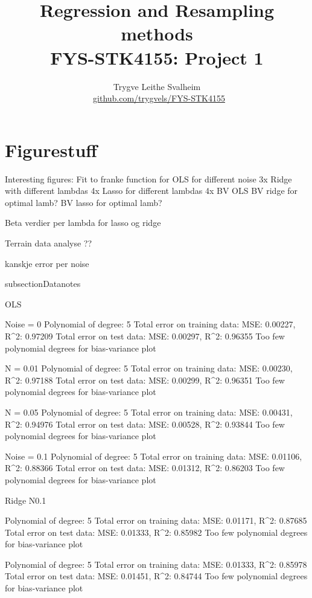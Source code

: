 \documentclass[a4paper, twocolumn]{article}
\title{{\sc Regression and Resampling methods \\ {\large FYS-STK4155: Project 1}}}
\author{Trygve Leithe Svalheim \\ \faGithub \ {\small \href{https://github.com/trygvels/FYS-STK4155}{github.com/trygvels/FYS-STK4155}}}
\begin{document}
\twocolumn[
\begin{@twocolumnfalse}
\maketitle
\begin{abstract}
\end{abstract}

\tableofcontents 
\end{@twocolumnfalse}]
\clearpage



\iffalse
\section{Figurestuff}
Interesting figures:
Fit to franke function for OLS for different noise 3x
Ridge with different lambdas 4x
Lasso for different lambdas 4x
BV OLS
BV ridge for optimal lamb?
BV lasso for optimal lamb?

Beta verdier per lambda for lasso og ridge

Terrain data analyse ??

kanskje error per noise

subsection{Datanotes}

OLS

Noise = 0
Polynomial of degree:  5
Total error on training data:
MSE: 0.00227,  R^2: 0.97209
Total error on test data:
MSE: 0.00297,  R^2: 0.96355
Too few polynomial degrees for bias-variance plot

N = 0.01
Polynomial of degree:  5
Total error on training data:
MSE: 0.00230,  R^2: 0.97188
Total error on test data:
MSE: 0.00299,  R^2: 0.96351
Too few polynomial degrees for bias-variance plot

N = 0.05
Polynomial of degree:  5
Total error on training data:
MSE: 0.00431,  R^2: 0.94976
Total error on test data:
MSE: 0.00528,  R^2: 0.93844
Too few polynomial degrees for bias-variance plot


Noise = 0.1
Polynomial of degree:  5
Total error on training data:
MSE: 0.01106,  R^2: 0.88366
Total error on test data:
MSE: 0.01312,  R^2: 0.86203
Too few polynomial degrees for bias-variance plot

Ridge N0.1

Polynomial of degree:  5
Total error on training data:
MSE: 0.01171,  R^2: 0.87685
Total error on test data:
MSE: 0.01333,  R^2: 0.85982
Too few polynomial degrees for bias-variance plot

Polynomial of degree:  5
Total error on training data:
MSE: 0.01333,  R^2: 0.85978
Total error on test data:
MSE: 0.01451,  R^2: 0.84744
Too few polynomial degrees for bias-variance plot
\end{document}
